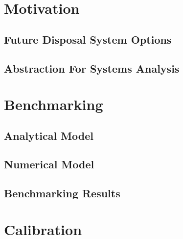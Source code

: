 

\section{Motivation}
\subsection{Future Disposal System Options}


\subsection{Abstraction For Systems Analysis}


\section{Benchmarking}
\subsection{Analytical Model}

\subsection{Numerical Model}

\subsection{Benchmarking Results}


\section{Calibration}




